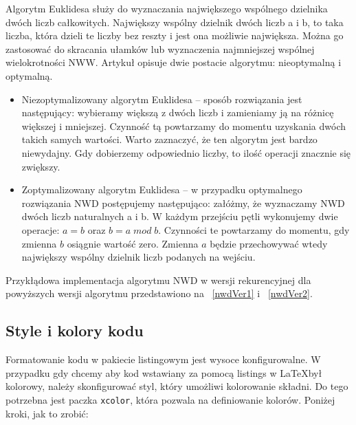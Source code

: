 Algorytm Euklidesa służy do wyznaczania największego wspólnego dzielnika dwóch liczb całkowitych. Największy wspólny dzielnik dwóch liczb a i  b, to taka liczba, która dzieli te liczby bez reszty i jest ona możliwie największa. Można go zastosować do skracania ułamków lub wyznaczenia najmniejszej wspólnej wielokrotności NWW. Artykuł opisuje dwie postacie algorytmu: nieoptymalną i optymalną.

\begin{itemize}
    \item Niezoptymalizowany algorytm Euklidesa -- sposób rozwiązania jest następujący: wybieramy większą z dwóch liczb i zamieniamy ją na różnicę większej i mniejszej. Czynność tą powtarzamy do momentu uzyskania dwóch takich samych wartości. Warto zaznaczyć, że ten algorytm jest bardzo niewydajny. Gdy dobierzemy odpowiednio liczby, to ilość operacji znacznie się zwiększy.
    \item Zoptymalizowany algorytm Euklidesa -- w przypadku optymalnego rozwiązania NWD postępujemy następująco: załóżmy, że wyznaczamy NWD dwóch liczb naturalnych a i b. W każdym przejściu pętli wykonujemy dwie operacje: $a = b$ oraz $b = a \; mod \; b$. Czynności te powtarzamy do momentu, gdy zmienna $b$ osiągnie wartość zero. Zmienna $a$ będzie przechowywać wtedy największy wspólny dzielnik liczb podanych na wejściu.
\end{itemize}

Przykłądowa implementacja algorytmu NWD w wersji rekurencyjnej dla powyższych wersji algorytmu przedstawiono na \listingname~\ref{nwdVer1} i ~\ref{nwdVer2}.







\subsection{Style i kolory kodu}

Formatowanie kodu w pakiecie listingowym jest wysoce konfigurowalne. W przypadku gdy chcemy aby kod wstawiany za pomocą listings w \LaTeX był kolorowy, należy skonfigurować styl, który umożliwi kolorowanie składni. Do tego potrzebna jest paczka \texttt{xcolor}, która pozwala na definiowanie kolorów. Poniżej kroki, jak to zrobić:

